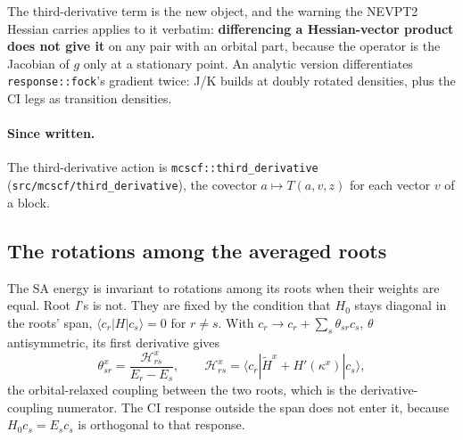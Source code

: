 \documentclass[11pt]{article}
\newcommand{\code}[1]{\texttt{#1}}
\begin{document}
The third-derivative term is the new object, and the warning the NEVPT2
Hessian carries applies to it verbatim: \textbf{differencing a
Hessian-vector product does not give it} on any pair with an orbital part,
because the operator is the Jacobian of $g$ only at a stationary point. An
analytic version differentiates \code{response::fock}'s gradient twice: J/K
builds at doubly rotated densities, plus the CI legs as transition
densities.

\paragraph{Since written.} The third-derivative action is
\code{mcscf::third\_derivative} (\code{src/mcscf/third\_derivative}), the
covector $a \mapsto T(a, v, z)$ for each vector $v$ of a block.

\subsection{The rotations among the averaged roots}
\label{sec:roots}

The SA energy is invariant to rotations among its roots when their weights
are equal. Root $I$'s is not. They are fixed by the condition that $H_0$
stays diagonal in the roots' span, $\langle c_r|H|c_s\rangle = 0$ for
$r \neq s$. With $c_r \to c_r + \sum_s\theta_{sr}c_s$, $\theta$
antisymmetric, its first derivative gives
\begin{equation}
  \theta^x_{sr} = \frac{\mathcal H^{x}_{rs}}{E_r - E_s},
  \qquad
  \mathcal H^{x}_{rs} = \langle c_r|\tilde H^{x} + H'(\kappa^x)|c_s\rangle,
  \label{eq:theta}
\end{equation}
the orbital-relaxed coupling between the two roots, which is the
derivative-coupling numerator. The CI response outside the span does not
enter it, because $H_0 c_s = E_s c_s$ is orthogonal to that response.
\end{document}
